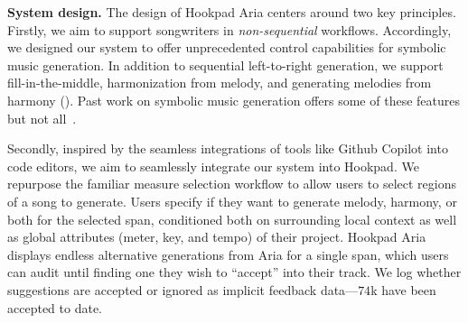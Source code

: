 \documentclass{article}
\newcommand\sysname{Hookpad Aria}
\newcommand\hookpad{Hookpad}
\begin{document}


\textbf{System design.}
The design of \sysname{} centers around two key principles. 
Firstly, we aim to support songwriters in \emph{non-sequential} workflows. 
Accordingly, we designed our system to offer unprecedented control capabilities for symbolic music generation. 
In addition to 
sequential left-to-right generation, 
we support fill-in-the-middle, 
harmonization from melody, and
generating melodies from harmony ().  
Past work on symbolic music generation offers some of these features but not all~\cite{huang2018music,huang2019bach,louie2020cococo,hadjeres2021piano,yeh2021automatic}. 

Secondly, 
inspired by the seamless integrations of tools like Github Copilot into code editors, 
we aim to seamlessly integrate our system into \hookpad.
We repurpose the familiar measure selection workflow to allow users to select regions of a song to generate. 
Users specify if they want to generate melody, harmony, or both for the selected span, conditioned both on surrounding local context as well as global attributes (meter, key, and tempo) of their project. 
\sysname{} displays endless alternative generations from Aria for a single span, which users can audit until finding one they wish to ``accept'' into their track. 
We log whether suggestions are accepted or ignored as implicit feedback data---$74$k have been accepted to date.
\end{document}
